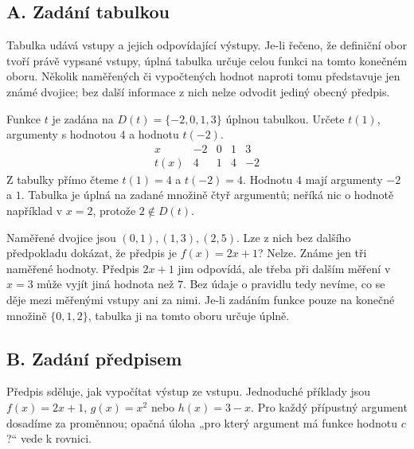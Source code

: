 \documentclass[11pt,a4paper]{article}
\begin{document}

\subsection*{A. Zadání tabulkou}
Tabulka udává vstupy a jejich odpovídající výstupy. Je-li řečeno, že definiční obor tvoří právě vypsané vstupy, úplná tabulka určuje celou funkci na tomto konečném oboru. Několik naměřených či vypočtených hodnot naproti tomu představuje jen známé dvojice; bez další informace z nich nelze odvodit jediný obecný předpis.

\begin{prikladReseniBox}
Funkce $t$ je zadána na $D(t)=\{-2,0,1,3\}$ úplnou tabulkou. Určete $t(1)$, argumenty s hodnotou $4$ a hodnotu $t(-2)$.
\[
\begin{array}{c|rrrr}
x&-2&0&1&3\\\hline
t(x)&4&1&4&-2
\end{array}
\]
\tcblower
Z tabulky přímo čteme $t(1)=4$ a $t(-2)=4$. Hodnotu $4$ mají argumenty $-2$ a $1$. Tabulka je úplná na zadané množině čtyř argumentů; neříká nic o hodnotě například v $x=2$, protože $2\notin D(t)$.
\end{prikladReseniBox}

\begin{prikladReseniBox}
Naměřené dvojice jsou $(0,1),(1,3),(2,5)$. Lze z nich bez dalšího předpokladu dokázat, že předpis je $f(x)=2x+1$?
\tcblower
Nelze. Známe jen tři naměřené hodnoty. Předpis $2x+1$ jim odpovídá, ale třeba při dalším měření v $x=3$ může vyjít jiná hodnota než $7$. Bez údaje o pravidlu tedy nevíme, co se děje mezi měřenými vstupy ani za nimi. Je-li zadáním funkce pouze na konečné množině $\{0,1,2\}$, tabulka ji na tomto oboru určuje úplně.
\end{prikladReseniBox}

\subsection*{B. Zadání předpisem}
Předpis sděluje, jak vypočítat výstup ze vstupu. Jednoduché příklady jsou $f(x)=2x+1$, $g(x)=x^2$ nebo $h(x)=3-x$. Pro každý přípustný argument dosadíme za proměnnou; opačná úloha „pro který argument má funkce hodnotu $c$?“ vede k rovnici.
\end{document}
